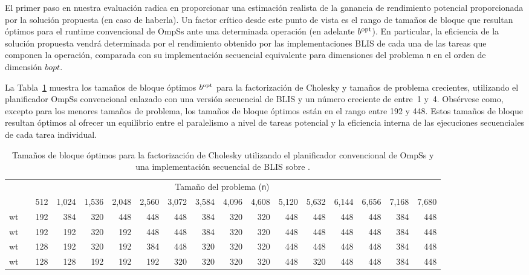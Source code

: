 El primer paso en nuestra evaluación radica en proporcionar una estimación realista de la ganancia de rendimiento
potencial proporcionada por la solución propuesta (en caso de haberla). Un factor crítico desde este punto de vista es
el rango de tamaños de bloque que resultan óptimos para el runtime convencional de OmpSs ante una determinada operación
(en adelante $b^{\mbox{\rm \scriptsize opt}}$). En particular, la eficiencia de la solución propuesta vendrá determinada por el rendimiento obtenido
por las implementaciones BLIS de cada una de las tareas que componen la operación, comparada con su implementación secuencial
equivalente para dimensiones del problema {\tt n} en el orden de dimensión $bopt$.

La Tabla~\ref{tab:optimal_bs_sym} muestra los tamaños de bloque óptimos $b^{\mbox{\rm \scriptsize opt}}$ para la factorización de Cholesky y tamaños
de problema crecientes, utilizando el planificador OmpSs convencional enlazado con una versión secuencial de BLIS y un número
creciente de \wts entre~1 y~4. Obsérvese como, excepto para los menores tamaños de problema, los tamaños de bloque óptimos están
en el rango entre 192 y 448. Estos tamaños de bloque resultan óptimos al ofrecer un equilibrio entre el paralelismo a nivel de tareas
potencial y la eficiencia interna de las ejecuciones secuenciales de cada tarea individual.

\newcommand{\ra}[1]{\renewcommand{\arraystretch}{#1}}
\newcommand{\ca}[1]{\renewcommand{\tabcolsep}{#1}}

\ra{1.2}
\ca{2pt}

\begin{table}
	\centering
	\caption{Tamaños de bloque óptimos para la factorización de Cholesky utilizando el planificador convencional
	         de OmpSs y una implementación secuencial de BLIS sobre \odroid.}
	\label{tab:optimal_bs_sym}
{\scriptsize
\begin{tabular}{crrrrrrrrrrrrrrrr} 
\toprule
  & \phantom{a} & \multicolumn{14}{c}{Tamaño del problema ({\tt n})} \\ 
\cmidrule{3-17} 
  & \phantom{a} &     512 & 1,024 & 1,536 & 2,048 & 2,560 & 3,072 & 3,584 & 4,096 & 4,608 & 5,120 & 5,632 & 6,144 & 6,656 & 7,168 & 7,680 \\ \hline

{\sc 1 wt} & \phantom{a} &     192 & 384  & 320  & 448  & 448  & 448  & 384  & 320 & 320 & 448 & 448 & 448 & 448 & 384 & 448 \\ \hline
{\sc 2 wt} & \phantom{a} &     192 & 192  & 320  & 192  & 448  & 448  & 384  & 320 & 320 & 448 & 448 & 448 & 448 & 384 & 448 \\ \hline
{\sc 3 wt} & \phantom{a} &     128 & 192  & 320  & 192  & 384  & 448  & 320  & 320 & 320 & 448 & 448 & 448 & 448 & 384 & 448 \\ \hline
{\sc 4 wt} & \phantom{a} &     128 & 128  & 192  & 192  & 192  & 320  & 320  & 320 & 320 & 448 & 320 & 448 & 448 & 384 & 448 \\ \bottomrule
\end{tabular}
}
\end{table}


